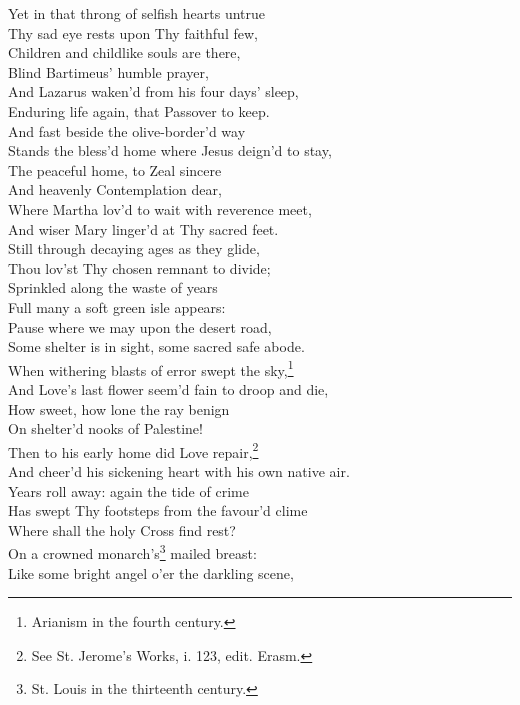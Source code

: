   Yet in that throng of selfish hearts untrue \\
 Thy sad eye rests upon Thy faithful few, \\
 Children and childlike souls are there, \\
 Blind Bartimeus’ humble prayer, \\
 And Lazarus waken’d from his four days’ sleep, \\
 Enduring life again, that Passover to keep. \\
  And fast beside the olive-border’d way \\
 Stands the bless’d home where Jesus deign’d to stay, \\
 The peaceful home, to Zeal sincere \\
 And heavenly Contemplation dear, \\
 Where Martha lov’d to wait with reverence meet, \\
 And wiser Mary linger’d at Thy sacred feet. \\
  Still through decaying ages as they glide, \\
 Thou lov’st Thy chosen remnant to divide; \\
 Sprinkled along the waste of years \\
 Full many a soft green isle appears: \\
 Pause where we may upon the desert road, \\
 Some shelter is in sight, some sacred safe abode. \\
  When withering blasts of error swept the sky,\footnote{Arianism in the fourth century.} \\
 And Love’s last flower seem’d fain to droop and die, \\
 How sweet, how lone the ray benign \\
 On shelter’d nooks of Palestine! \\
 Then to his early home did Love repair,\footnote{See St. Jerome’s Works, i. 123, edit. Erasm.} \\
 And cheer’d his sickening heart with his own native air. \\
  Years roll away: again the tide of crime \\
 Has swept Thy footsteps from the favour’d clime \\
 Where shall the holy Cross find rest? \\
 On a crowned monarch’s\footnote{St. Louis in the thirteenth century.} mailed breast: \\
 Like some bright angel o’er the darkling scene, \\
